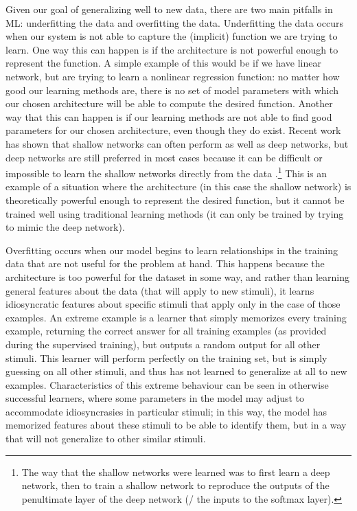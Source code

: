 Given our goal of generalizing well to new data,
there are two main pitfalls in ML: underfitting the data and overfitting the data.
Underfitting the data occurs when our system is not able
to capture the (implicit) function we are trying to learn.
One way this can happen is if the architecture is not powerful enough
to represent the function.
A simple example of this would be if we have linear network,
but are trying to learn a nonlinear regression function:
no matter how good our learning methods are,
there is no set of model parameters with which our chosen architecture
will be able to compute the desired function.
Another way that this can happen is if our learning methods
are not able to find good parameters for our chosen architecture,
even though they do exist.
Recent work has shown that shallow networks
can often perform as well as deep networks,
but deep networks are still preferred in most cases
because it can be difficult or impossible to learn the shallow networks
directly from the data \parencite{Ba2014}.\footnote{
  The way that the shallow networks were learned
  was to first learn a deep network,
  then to train a shallow network to reproduce the outputs
  of the penultimate layer of the deep network
  (\ie/ the inputs to the softmax layer).}
This is an example of a situation where the architecture
(in this case the shallow network)
is theoretically powerful enough to represent the desired function,
but it cannot be trained well using traditional learning methods
(it can only be trained by trying to mimic the deep network).

Overfitting occurs when our model begins to learn
relationships in the training data
that are not useful for the problem at hand.
This happens because the architecture
is too powerful for the dataset in some way,
and rather than learning general features about the data
(that will apply to new stimuli),
it learns idiosyncratic features about specific stimuli
that apply only in the case of those examples.
An extreme example is a learner that simply memorizes every training example,
returning the correct answer for all training examples
(as provided during the supervised training),
but outputs a random output for all other stimuli.
This learner will perform perfectly on the training set,
but is simply guessing on all other stimuli,
and thus has not learned to generalize at all to new examples.
Characteristics of this extreme behaviour can be seen in otherwise successful learners,
where some parameters in the model may adjust to accommodate
idiosyncrasies in particular stimuli;
in this way, the model has memorized features about these stimuli
to be able to identify them,
but in a way that will not generalize to other similar stimuli.

